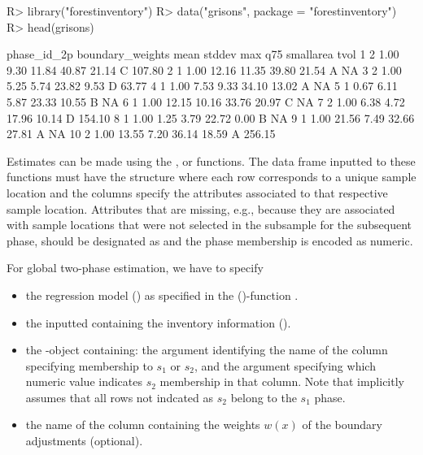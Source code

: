 \begin{small}
\begin{Schunk}
\begin{Sinput}
R> library("forestinventory")
R> data("grisons", package = "forestinventory")
R> head(grisons)
\end{Sinput}
\end{Schunk}
\end{small}

\begin{small}
\begin{Schunk}
\begin{Soutput}
   phase_id_2p boundary_weights  mean stddev   max   q75 smallarea   tvol
1            2             1.00  9.30  11.84 40.87 21.14         C 107.80
2            1             1.00 12.16  11.35 39.80 21.54         A     NA
3            2             1.00  5.25   5.74 23.82  9.53         D  63.77
4            1             1.00  7.53   9.33 34.10 13.02         A     NA
5            1             0.67  6.11   5.87 23.33 10.55         B     NA
6            1             1.00 12.15  10.16 33.76 20.97         C     NA
7            2             1.00  6.38   4.72 17.96 10.14         D 154.10
8            1             1.00  1.25   3.79 22.72  0.00         B     NA
9            1             1.00 21.56   7.49 32.66 27.81         A     NA
10           2             1.00 13.55   7.20 36.14 18.59         A 256.15
\end{Soutput}
\end{Schunk}
\end{small}

Estimates can be made using the ,  or  functions. The data frame inputted to these functions must have the structure where each row corresponds to a unique sample location and the columns specify the attributes associated to that respective sample location. Attributes that are missing, e.g., because they are associated with sample locations that were not selected in the subsample for the subsequent phase, should be designated as  and the phase membership is encoded as numeric.

For global two-phase estimation, we have to specify

\begin{itemize}
  \itemsep0em
  \item the regression model () as specified in the ()-function \citep{R}.
  \item the inputted  containing the inventory information ().
  \item the -object  containing: the  argument identifying the name of the column specifying membership to $s_1$ or $s_2$, and the  argument specifying which numeric value indicates $s_2$ membership in that column. Note that  implicitly assumes that all rows not indcated as $s_2$ belong to the $s_1$ phase.
  \item the name of the column containing the weights $w(x)$ of the boundary adjustments (optional).
\end{itemize}

